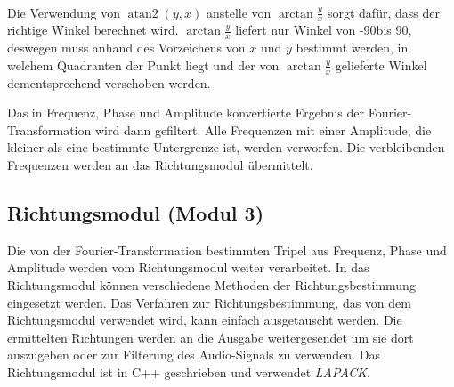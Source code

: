 \\
Die Verwendung von $\operatorname{atan2}(y,x)$ anstelle von $\arctan\frac{y}{x}$ sorgt dafür, dass der richtige Winkel berechnet wird. $\arctan\frac{y}{x}$ liefert nur Winkel von -90\degree bis 90\degree, deswegen muss anhand des Vorzeichens von $x$ und $y$ bestimmt werden, in welchem Quadranten der Punkt liegt und der von $\arctan\frac{y}{x}$ gelieferte Winkel dementsprechend verschoben werden.

Das in Frequenz, Phase und Amplitude konvertierte Ergebnis der Fourier-Transformation wird dann gefiltert. Alle Frequenzen mit einer Amplitude, die kleiner als eine bestimmte Untergrenze ist, werden verworfen. Die verbleibenden Frequenzen werden an das Richtungsmodul übermittelt.

\subsection{Richtungsmodul (Modul 3)}
Die von der Fourier-Transformation bestimmten Tripel aus Frequenz, Phase und Amplitude werden vom Richtungsmodul weiter verarbeitet. In das Richtungsmodul können verschiedene Methoden der Richtungsbestimmung eingesetzt werden. Das Verfahren zur Richtungsbestimmung, das von dem Richtungsmodul verwendet wird, kann einfach ausgetauscht werden. Die ermittelten Richtungen werden an die Ausgabe weitergesendet um sie dort auszugeben oder zur Filterung des Audio-Signals zu verwenden.
Das Richtungsmodul ist in C++ geschrieben und verwendet \textit{LAPACK}\cite{Anderson:1990:LPL:110382.110385}.
